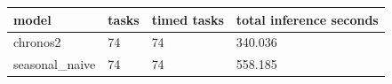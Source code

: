 \begin{tabular}{llll}
\toprule
model & tasks & timed tasks & total inference seconds \\
\midrule
chronos2 & 74 & 74 & 340.036 \\
seasonal\_naive & 74 & 74 & 558.185 \\
\bottomrule
\end{tabular}
